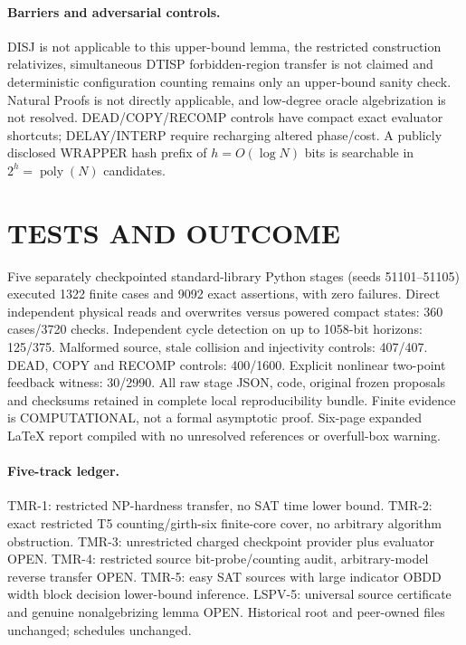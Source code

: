 \documentclass[11pt]{article}
\begin{document}
\paragraph{Barriers and adversarial controls.} DISJ is not applicable to this upper-bound lemma, the restricted construction relativizes, simultaneous DTISP forbidden-region transfer is not claimed and deterministic configuration counting remains only an upper-bound sanity check. Natural Proofs is not directly applicable, and low-degree oracle algebrization is not resolved. DEAD/COPY/RECOMP controls have compact exact evaluator shortcuts; DELAY/INTERP require recharging altered phase/cost. A publicly disclosed WRAPPER hash prefix of $h=O(\log N)$ bits is searchable in $2^h=\operatorname{poly}(N)$ candidates.

\section{TESTS AND OUTCOME}
Five separately checkpointed standard-library Python stages (seeds 51101--51105) executed 1322 finite cases and 9092 exact assertions, with zero failures. Direct independent physical reads and overwrites versus powered compact states: 360 cases/3720 checks. Independent cycle detection on up to 1058-bit horizons: 125/375. Malformed source, stale collision and injectivity controls: 407/407. DEAD, COPY and RECOMP controls: 400/1600. Explicit nonlinear two-point feedback witness: 30/2990. All raw stage JSON, code, original frozen proposals and checksums retained in complete local reproducibility bundle. Finite evidence is COMPUTATIONAL, not a formal asymptotic proof. Six-page expanded LaTeX report compiled with no unresolved references or overfull-box warning.
\paragraph{Five-track ledger.} TMR-1: restricted NP-hardness transfer, no SAT time lower bound. TMR-2: exact restricted T5 counting/girth-six finite-core cover, no arbitrary algorithm obstruction. TMR-3: unrestricted charged checkpoint provider plus evaluator OPEN. TMR-4: restricted source bit-probe/counting audit, arbitrary-model reverse transfer OPEN. TMR-5: easy SAT sources with large indicator OBDD width block decision lower-bound inference. LSPV-5: universal source certificate and genuine nonalgebrizing lemma OPEN. Historical root and peer-owned files unchanged; schedules unchanged.
\end{document}
